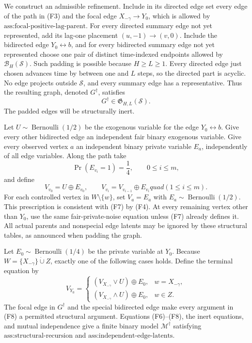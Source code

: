 We construct an admissible refinement.  Include in its directed edge set every edge of the path in (F3) and the focal edge \(X_{-\gamma}\to Y_0\), which is allowed by \(\text{ass:focal-positive-lag-parent}\).  For every directed summary edge not yet represented, add its lag-one placement \((u,-1)\to(v,0)\).  Include the bidirected edge \(Y_0\leftrightarrow b\), and for every bidirected summary edge not yet represented choose one pair of distinct time-indexed endpoints allowed by \(\mathcal B_H(\mathcal S)\).  Such padding is possible because \(H\ge L\ge1\).  Every directed edge just chosen advances time by between one and \(L\) steps, so the directed part is acyclic.  No edge projects outside \(\mathcal S\), and every summary edge has a representative.  Thus the resulting graph, denoted \(G^{\dagger}\), satisfies
\[
G^{\dagger}\in\mathfrak G_{H,L}(\mathcal S).
\tag{F5}
\]
The padded edges will be structurally inert.

Let \(U\sim\operatorname{Bernoulli}(1/2)\) be the exogenous variable for the edge \(Y_0\leftrightarrow b\).  Give every other bidirected edge an independent fair binary exogenous variable.  Give every observed vertex \(a\) an independent binary private variable \(E_a\), independently of all edge variables.  Along the path take
\[
\Pr(E_{v_i}=1)=\frac14,
\qquad 0\le i\le m,
\tag{F6}
\]
and define
\[
V_{v_0}=U\mathbin\oplus E_{v_0},
\qquad
V_{v_i}=V_{v_{i-1}}\mathbin\oplus E_{v_i}quad(1\le i\le m).
\tag{F7}
\]
For each controlled vertex in \(W\setminus\{w\}\), set \(V_a=E_a\) with \(E_a\sim\operatorname{Bernoulli}(1/2)\).  This prescription is consistent with (F7) by (F4).  At every remaining vertex other than \(Y_0\), use the same fair-private-noise equation unless (F7) already defines it.  All actual parents and nonspecial edge latents may be ignored by these structural tables, as announced when padding the graph.

Let \(E_0\sim\operatorname{Bernoulli}(1/4)\) be the private variable at \(Y_0\).  Because \(W=\{X_{-\gamma}\}\mathbin{\dot\cup}Z\), exactly one of the following cases holds.  Define the terminal equation by
\[
V_{Y_0}=
\begin{cases}
(V_{X_{-\gamma}}\mathbin\vee U)\mathbin\oplus E_0,
&w=X_{-\gamma},\\[2mm]
(V_{X_{-\gamma}}\mathbin\wedge U)\mathbin\oplus E_0,
&w\in Z.
\end{cases}
\tag{F8}
\]
The focal edge in \(G^{\dagger}\) and the special bidirected edge make every argument in (F8) a permitted structural argument.  Equations (F6)--(F8), the inert equations, and mutual independence give a finite binary model \(\mathcal M^{\dagger}\) satisfying \(\text{ass:structural-recursion}\) and \(\text{ass:independent-edge-latents}\).

